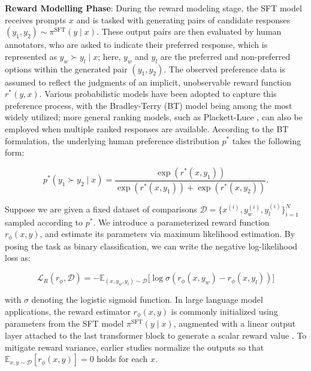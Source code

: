 \textbf{Reward Modelling Phase}: During the reward modeling stage, the SFT model receives prompts $x$ and is tasked with generating pairs of candidate responses $(y_1, y_2)\sim \pi^\text{SFT}(y \mid x)$. These output pairs are then evaluated by human annotators, who are asked to indicate their preferred response, which is represented as $y_w\succ y_l \mid x$; here, $y_w$ and $y_l$ are the preferred and non-preferred options within the generated pair $(y_1, y_2)$. The observed preference data is assumed to reflect the judgments of an implicit, unobservable reward function $r^*(y, x)$. Various probabilistic models have been adopted to capture this preference process, with the Bradley-Terry (BT) \cite{bradley1952rankanalysis} model being among the most widely utilized; more general ranking models, such as Plackett-Luce \citep{plackett1975analysis, luce2012individual}, can also be employed when multiple ranked responses are available. According to the BT formulation, the underlying human preference distribution $p^*$ takes the following form:

\begin{equation}\label{eq:bradley-terry}
    p^*(y_1\succ y_2 \mid x)=\frac{\exp\left(r^*(x, y_1)\right)}{\exp\left(r^*(x, y_1)\right) + \exp\left(r^*(x, y_2)\right)}.
\end{equation}

Suppose we are given a fixed dataset of comparisons $\mathcal{D}=\bigl\{x^{(i)}, y_w^{(i)}, y_l^{(i)}\bigr\}_{i=1}^N$ sampled according to $p^*$. We introduce a parameterized reward function $r_{\phi}(x, y)$, and estimate its parameters via maximum likelihood estimation. By posing the task as binary classification, we can write the negative log-likelihood loss as:

\begin{equation}\label{eq:reward_model}
    \mathcal{L}_R(r_{\phi}, \mathcal{D}) = -\mathbb{E}_{(x, y_w, y_l)\sim \mathcal{D}}\bigl[\log \sigma(r_{\phi}(x, y_w)- r_{\phi}(x, y_l))\bigr]
\end{equation}

with $\sigma$ denoting the logistic sigmoid function. In large language model applications, the reward estimator $r_{\phi}(x, y)$ is commonly initialized using parameters from the SFT model $\pi^\text{SFT}(y \mid x)$, augmented with a linear output layer attached to the last transformer block to generate a scalar reward value \cite{ziegler2020finetuning}. To mitigate reward variance, earlier studies normalize the outputs so that $\mathbb{E}_{x,y\sim \mathcal{D}}\left[r_\phi(x, y)\right] = 0$ holds for each $x$.

